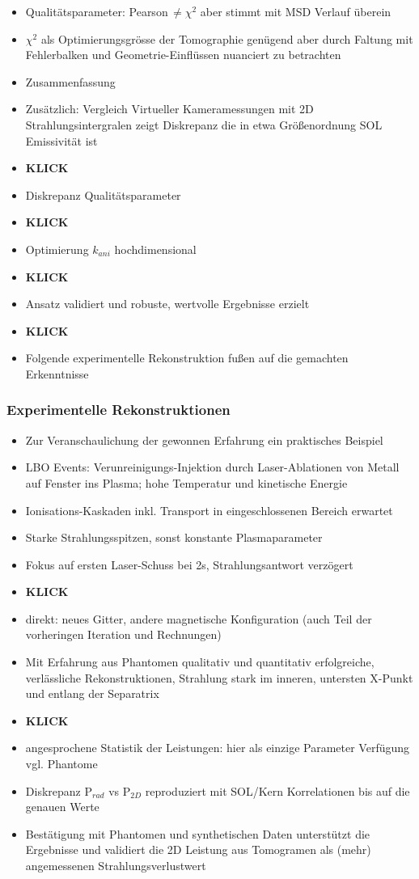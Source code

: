\documentclass[11pt,a4paper]{article}
\begin{document}
\begin{itemize}
\item Qualitätsparameter: Pearson\,$\ne\chi^{2}$ aber stimmt mit MSD Verlauf überein
\item $\chi^{2}$ als Optimierungsgrösse der Tomographie genügend aber durch Faltung mit Fehlerbalken und Geometrie-Einflüssen nuanciert zu betrachten
\item Zusammenfassung
\item Zusätzlich: Vergleich Virtueller Kameramessungen mit 2D Strahlungsintergralen zeigt Diskrepanz die in etwa Größenordnung SOL Emissivität ist
\item \textbf{KLICK}
\item Diskrepanz Qualitätsparameter
\item \textbf{KLICK}
\item Optimierung $k_{ani}$ hochdimensional
\item \textbf{KLICK}
\item Ansatz validiert und robuste, wertvolle Ergebnisse erzielt
\item \textbf{KLICK}
\item Folgende experimentelle Rekonstruktion fußen auf die gemachten Erkenntnisse
\end{itemize}

\subsubsection*{Experimentelle Rekonstruktionen}

\begin{itemize}
  \item Zur Veranschaulichung der gewonnen Erfahrung ein praktisches Beispiel
  \item LBO Events: Verunreinigungs-Injektion durch Laser-Ablationen von Metall auf Fenster ins Plasma; hohe Temperatur und kinetische Energie
  \item Ionisations-Kaskaden inkl. Transport in eingeschlossenen Bereich erwartet
  \item Starke Strahlungsspitzen, sonst konstante Plasmaparameter
  \item Fokus auf ersten Laser-Schuss bei 2s, Strahlungsantwort verzögert
  \item \textbf{KLICK}
  \item direkt: neues Gitter, andere magnetische Konfiguration (auch Teil der vorheringen Iteration und Rechnungen)
  \item Mit Erfahrung aus Phantomen qualitativ und quantitativ erfolgreiche, verlässliche Rekonstruktionen, Strahlung stark im inneren, untersten X-Punkt und entlang der Separatrix
  \item \textbf{KLICK}
  \item angesprochene Statistik der Leistungen: hier als einzige Parameter Verfügung vgl. Phantome
  \item Diskrepanz P$_{rad}$ vs P$_{2D}$ reproduziert mit SOL/Kern Korrelationen bis auf die genauen Werte
  \item Bestätigung mit Phantomen und synthetischen Daten unterstützt die Ergebnisse und validiert die 2D Leistung aus Tomogramen als (mehr) angemessenen Strahlungsverlustwert
\end{itemize}
\end{document}
